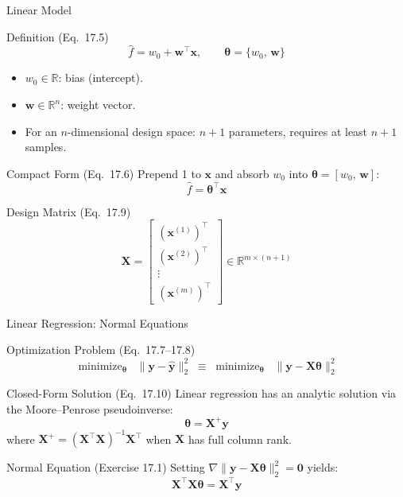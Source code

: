 \documentclass[aspectratio=169,10pt]{beamer}
\newcommand{\vx}{\mathbf{x}}
\newcommand{\vy}{\mathbf{y}}
\newcommand{\vw}{\mathbf{w}}
\newcommand{\btheta}{\boldsymbol{\theta}}
\newcommand{\bX}{\mathbf{X}}
\newcommand{\R}{\mathbb{R}}
\newcommand{\hatf}{\hat{f}}
\DeclareMathOperator*{\minimize}{minimize}
\begin{document}
\begin{frame}{Linear Model}
  \begin{block}{Definition (Eq.\ 17.5)}
    \[
      \hatf = w_0 + \vw^{\top}\vx, \qquad
      \btheta = \{w_0,\,\vw\}
    \]
    \begin{itemize}
      \item $w_0 \in \R$: bias (intercept).
      \item $\vw \in \R^n$: weight vector.
      \item For an $n$-dimensional design space: $n+1$ parameters, requires at least $n+1$ samples.
    \end{itemize}
  \end{block}

  \begin{block}{Compact Form (Eq.\ 17.6)}
    Prepend 1 to $\vx$ and absorb $w_0$ into $\btheta = [w_0,\,\vw]$:
    \[
      \hatf = \btheta^{\top}\vx
    \]
  \end{block}

  \begin{block}{Design Matrix (Eq.\ 17.9)}
    \[
      \bX =
      \begin{bmatrix}
        (\vx^{(1)})^{\top} \\
        (\vx^{(2)})^{\top} \\
        \vdots \\
        (\vx^{(m)})^{\top}
      \end{bmatrix}
      \in \R^{m \times (n+1)}
    \]
  \end{block}
\end{frame}

\begin{frame}{Linear Regression: Normal Equations}
  \begin{block}{Optimization Problem (Eq.\ 17.7--17.8)}
    \[
      \minimize_{\btheta} \;\; \|\vy - \hat{\vy}\|_2^2
      \;\equiv\;
      \minimize_{\btheta} \;\; \|\vy - \bX\btheta\|_2^2
    \]
  \end{block}

  \begin{block}{Closed-Form Solution (Eq.\ 17.10)}
    Linear regression has an \alert{analytic solution} via the Moore--Penrose pseudoinverse:
    \[
      \btheta = \bX^{+}\vy
    \]
    where $\bX^{+} = (\bX^{\top}\bX)^{-1}\bX^{\top}$ when $\bX$ has full column rank.
  \end{block}

  \begin{alertblock}{Normal Equation (Exercise 17.1)}
    Setting $\nabla\|\vy - \bX\btheta\|_2^2 = \mathbf{0}$ yields:
    \[
      \bX^{\top}\bX\btheta = \bX^{\top}\vy
    \]
  \end{alertblock}
\end{frame}
\end{document}
